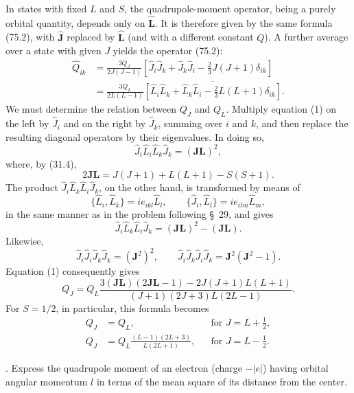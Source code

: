\SolutionHeading In states with fixed $L$ and $S$, the quadrupole-moment operator, being a purely orbital quantity, depends only on $\widehat{\mathbf L}$. It is therefore given by the same formula (75.2), with $\widehat{\mathbf J}$ replaced by $\widehat{\mathbf L}$ (and with a different constant $Q$). A further average over a state with given $J$ yields the operator (75.2):
\begin{equation}
\begin{split}
 \widehat Q_{ik}&=\frac{3Q_J}{2J(J-1)}\left[\widehat J_i\widehat J_k+\widehat J_k\widehat J_i-\frac23J(J+1)\delta_{ik}\right]\\
 &=\frac{3Q_L}{2L(L-1)}\overline{\left[\widehat L_i\widehat L_k+\widehat L_k\widehat L_i-\frac23L(L+1)\delta_{ik}\right]}.
\end{split}
\tag{1}
\end{equation}
We must determine the relation between $Q_J$ and $Q_L$. Multiply equation (1) on the left by $\widehat J_i$ and on the right by $\widehat J_k$, summing over $i$ and $k$, and then replace the resulting diagonal operators by their eigenvalues. In doing so,
\[
 \widehat J_i\widehat L_i\widehat L_k\widehat J_k=(\mathbf{JL})^2,
\]
where, by (31.4),
\[
 2\mathbf{JL}=J(J+1)+L(L+1)-S(S+1).
\]
The product $\widehat J_i\widehat L_k\widehat L_i\widehat J_k$, on the other hand, is transformed by means of
\[
 \{\widehat L_i,\widehat L_k\}=i e_{ikl}\widehat L_l,\qquad
 \{\widehat J_i,\widehat L_l\}=i e_{ilm}\widehat L_m,
\]
in the same manner as in the problem following \S~29, and gives
\[
 \widehat J_i\widehat L_k\widehat L_i\widehat J_k=(\mathbf{JL})^2-(\mathbf{JL}).
\]
Likewise,
\[
 \widehat J_i\widehat J_i\widehat J_k\widehat J_k=(\mathbf J^2)^2,\qquad
 \widehat J_i\widehat J_k\widehat J_i\widehat J_k=\mathbf J^2(\mathbf J^2-1).
\]
Equation (1) consequently gives
\begin{equation}
 Q_J=Q_L\frac{3(\mathbf{JL})(2\mathbf{JL}-1)-2J(J+1)L(L+1)}{(J+1)(2J+3)L(2L-1)}.
 \tag{2}
\end{equation}
For $S=1/2$, in particular, this formula becomes
\begin{equation}
 \begin{aligned}
 Q_J&=Q_L, &&\text{for }J=L+\frac12,\\
 Q_J&=Q_L\frac{(L-1)(2L+3)}{L(2L+1)}, &&\text{for }J=L-\frac12.
 \end{aligned}
 \tag{3}
\end{equation}

. Express the quadrupole moment of an electron (charge $-|e|$) having orbital angular momentum $l$ in terms of the mean square of its distance from the center.

